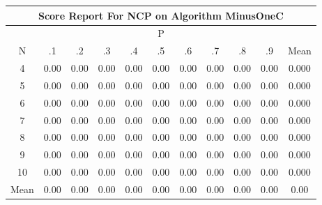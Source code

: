 \documentclass[11pt,a4paper]{report}
\begin{document}
\begin{longtable}{ | c || c | c | c | c | c | c | c | c | c || c |}
\hline
\multicolumn{11}{|c|}{ Score Report For NCP on Algorithm MinusOneC} \\
\hline
\multicolumn{11}{|c|}{ P } \\
\hline
N & .1 & .2 & .3 & .4 & .5 & .6 & .7 & .8 & .9 & Mean\\
 \hline
 \hline
 \endhead
  4 &  \cellcolor[HTML]{FFFFFF} 0.00 &  \cellcolor[HTML]{FFFFFF} 0.00 &  \cellcolor[HTML]{FFFFFF} 0.00 &  \cellcolor[HTML]{FFFFFF} 0.00 &  \cellcolor[HTML]{FFFFFF} 0.00 &  \cellcolor[HTML]{FFFFFF} 0.00 &  \cellcolor[HTML]{FFFFFF} 0.00 &  \cellcolor[HTML]{FFFFFF} 0.00 &  \cellcolor[HTML]{FFFFFF} 0.00 & 0.000 \\
  5 &  \cellcolor[HTML]{FFFFFF} 0.00 &  \cellcolor[HTML]{FFFFFF} 0.00 &  \cellcolor[HTML]{FFFFFF} 0.00 &  \cellcolor[HTML]{FFFFFF} 0.00 &  \cellcolor[HTML]{FFFFFF} 0.00 &  \cellcolor[HTML]{FFFFFF} 0.00 &  \cellcolor[HTML]{FFFFFF} 0.00 &  \cellcolor[HTML]{FFFFFF} 0.00 &  \cellcolor[HTML]{FFFFFF} 0.00 & 0.000 \\
  6 &  \cellcolor[HTML]{FFFFFF} 0.00 &  \cellcolor[HTML]{FFFFFF} 0.00 &  \cellcolor[HTML]{FFFFFF} 0.00 &  \cellcolor[HTML]{FFFFFF} 0.00 &  \cellcolor[HTML]{FFFFFF} 0.00 &  \cellcolor[HTML]{FFFFFF} 0.00 &  \cellcolor[HTML]{FFFFFF} 0.00 &  \cellcolor[HTML]{FFFFFF} 0.00 &  \cellcolor[HTML]{FFFFFF} 0.00 & 0.000 \\
  7 &  \cellcolor[HTML]{FFFFFF} 0.00 &  \cellcolor[HTML]{FFFFFF} 0.00 &  \cellcolor[HTML]{FFFFFF} 0.00 &  \cellcolor[HTML]{FFFFFF} 0.00 &  \cellcolor[HTML]{FFFFFF} 0.00 &  \cellcolor[HTML]{FFFFFF} 0.00 &  \cellcolor[HTML]{FFFFFF} 0.00 &  \cellcolor[HTML]{FFFFFF} 0.00 &  \cellcolor[HTML]{FFFFFF} 0.00 & 0.000 \\
  8 &  \cellcolor[HTML]{FFFFFF} 0.00 &  \cellcolor[HTML]{FFFFFF} 0.00 &  \cellcolor[HTML]{FFFFFF} 0.00 &  \cellcolor[HTML]{FFFFFF} 0.00 &  \cellcolor[HTML]{FFFFFF} 0.00 &  \cellcolor[HTML]{FFFFFF} 0.00 &  \cellcolor[HTML]{FFFFFF} 0.00 &  \cellcolor[HTML]{FFFFFF} 0.00 &  \cellcolor[HTML]{FFFFFF} 0.00 & 0.000 \\
  9 &  \cellcolor[HTML]{FFFFFF} 0.00 &  \cellcolor[HTML]{FFFFFF} 0.00 &  \cellcolor[HTML]{FFFFFF} 0.00 &  \cellcolor[HTML]{FFFFFF} 0.00 &  \cellcolor[HTML]{FFFFFF} 0.00 &  \cellcolor[HTML]{FFFFFF} 0.00 &  \cellcolor[HTML]{FFFFFF} 0.00 &  \cellcolor[HTML]{FFFFFF} 0.00 &  \cellcolor[HTML]{FFFFFF} 0.00 & 0.000 \\
  10 &  \cellcolor[HTML]{FFFFFF} 0.00 &  \cellcolor[HTML]{FFFFFF} 0.00 &  \cellcolor[HTML]{FFFFFF} 0.00 &  \cellcolor[HTML]{FFFFFF} 0.00 &  \cellcolor[HTML]{FFFFFF} 0.00 &  \cellcolor[HTML]{FFFFFF} 0.00 &  \cellcolor[HTML]{FFFFFF} 0.00 &  \cellcolor[HTML]{FFFFFF} 0.00 &  \cellcolor[HTML]{FFFFFF} 0.00 & 0.000 \\
 \hline
 \hline
Mean &  \cellcolor[HTML]{FFFFFF} 0.00 &  \cellcolor[HTML]{FFFFFF} 0.00 &  \cellcolor[HTML]{FFFFFF} 0.00 &  \cellcolor[HTML]{FFFFFF} 0.00 &  \cellcolor[HTML]{FFFFFF} 0.00 &  \cellcolor[HTML]{FFFFFF} 0.00 &  \cellcolor[HTML]{FFFFFF} 0.00 &  \cellcolor[HTML]{FFFFFF} 0.00 &  \cellcolor[HTML]{FFFFFF} 0.00 &  \cellcolor[HTML]{FFFFFF} 0.00
\end{longtable}
\end{document}
